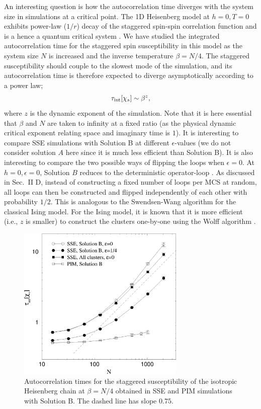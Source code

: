 \documentclass[10pt,pre,aps,twocolumn,showpacs,superscriptaddress,
floatfix]{revtex4}
\begin{document}
An interesting question is how the autocorrelation time diverges with the 
system size in simulations at a critical point. The 1D Heisenberg model at
$h=0, T=0$ exhibits power-law ($1/r$) decay of the staggered spin-spin 
correlation function and is a hence a quantum critical system \cite{luther}. 
We have studied the integrated autocorrelation time for the staggered spin 
susceptibility in this model as the system size $N$ is increased and the 
inverse temperature $\beta=N/4$. The staggered susceptibility should couple 
to the slowest mode of the simulation, and its autocorrelation time is 
therefore expected to diverge asymptotically according to a power law;
\begin{equation}
\tau_{\rm int}[\chi_s] \sim \beta^{z},
\end{equation}
where $z$  is the dynamic exponent of the simulation. Note that it is here 
essential that $\beta$ and $N$ are taken to infinity at a fixed ratio (as the 
physical dynamic critical exponent relating space and imaginary time is $1$). 
It is interesting to compare SSE simulations with Solution B at different 
$\epsilon$-values (we do not consider solution $A$ here since it is much
less efficient than Solution B). It is also interesting to compare 
the two possible ways of flipping the loops when $\epsilon=0$. At $h=0, 
\epsilon=0$, Solution $B$ reduces to the deterministic 
operator-loop \cite{sse3}. As discussed in Sec.~II D, instead of
constructing a fixed number of loops per MCS at random, all loops can then be 
constructed and flipped independently of each other with probability $1/2$. 
This is analogous to the Swendsen-Wang \cite{swendsen} algorithm for the 
classical Ising model. For the Ising model, it is known that it is more 
efficient (i.e., $z$ is smaller) to construct the clusters one-by-one using 
the Wolff algorithm \cite{wolff}. 

\begin{figure}
\includegraphics[clip,width=8cm]{fig26.eps}
\caption{Autocorrelation times for the staggered susceptibility of the 
isotropic Heisenberg chain at $\beta=N/4$ obtained in SSE and PIM simulations 
with Solution B. The dashed line has slope $0.75$.}
\label{logtau1d}
\end{figure}
\end{document}

